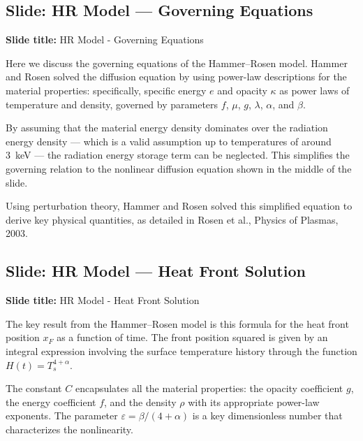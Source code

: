 \documentclass[12pt, a4paper]{article}
\begin{document}
\subsection{Slide: HR Model --- Governing Equations}

\begin{slidebox}
\textbf{Slide title:} HR Model - Governing Equations
\end{slidebox}

Here we discuss the governing equations of the Hammer--Rosen model. Hammer and Rosen solved the diffusion equation by using power-law descriptions for the material properties: specifically, specific energy $e$ and opacity $\kappa$ as power laws of temperature and density, governed by parameters $f$, $\mu$, $g$, $\lambda$, $\alpha$, and $\beta$.

By assuming that the material energy density dominates over the radiation energy density --- which is a valid assumption up to temperatures of around 3~keV --- the radiation energy storage term can be neglected. This simplifies the governing relation to the nonlinear diffusion equation shown in the middle of the slide.

Using perturbation theory, Hammer and Rosen solved this simplified equation to derive key physical quantities, as detailed in Rosen et al., Physics of Plasmas, 2003.

\subsection{Slide: HR Model --- Heat Front Solution}

\begin{slidebox}
\textbf{Slide title:} HR Model - Heat Front Solution
\end{slidebox}

The key result from the Hammer--Rosen model is this formula for the heat front position $x_F$ as a function of time. The front position squared is given by an integral expression involving the surface temperature history through the function $H(t) = T_s^{4+\alpha}$.

The constant $C$ encapsulates all the material properties: the opacity coefficient $g$, the energy coefficient $f$, and the density $\rho$ with its appropriate power-law exponents. The parameter $\varepsilon = \beta/(4+\alpha)$ is a key dimensionless number that characterizes the nonlinearity.
\end{document}
